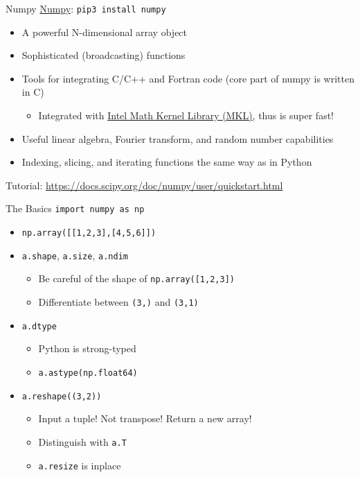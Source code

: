 \documentclass{../TexTemplate/myslide}
\begin{document}
\begin{frame}[fragile]{Numpy}
\href{https://numpy.org/}{Numpy}: \verb'pip3 install numpy' 
\begin{itemize}
	\item A powerful N-dimensional array object
	\item Sophisticated (broadcasting) functions
	\item Tools for integrating C/C++ and Fortran code (core part of numpy is written in C)
	\begin{itemize}
		\item Integrated with \href{https://software.intel.com/en-us/mkl}{Intel Math Kernel Library (MKL)}, thus is super fast!
	\end{itemize}
	\item Useful linear algebra, Fourier transform, and random number capabilities
	\item Indexing, slicing, and iterating functions the same way as in Python
\end{itemize}
Tutorial: \url{https://docs.scipy.org/doc/numpy/user/quickstart.html}
\end{frame}

\begin{frame}[fragile]{The Basics}
\verb'import numpy as np'
\begin{itemize}
	\item \verb'np.array([[1,2,3],[4,5,6]])'
	\item \verb'a.shape', \verb'a.size', \verb'a.ndim'
	\begin{itemize}
		\item Be careful of the shape of \verb'np.array([1,2,3])'
		\item Differentiate between \verb'(3,)' and \verb'(3,1)'
	\end{itemize}
	\item \verb'a.dtype'
	\begin{itemize}
		\item Python is strong-typed
		\item \verb'a.astype(np.float64)'
	\end{itemize}
	\item \verb'a.reshape((3,2))'
	\begin{itemize}
		\item Input a tuple! Not transpose! Return a new array!
		\item Distinguish with \verb'a.T'
		\item \verb'a.resize' is inplace
	\end{itemize}
\end{itemize}
\end{frame}
\end{document}
